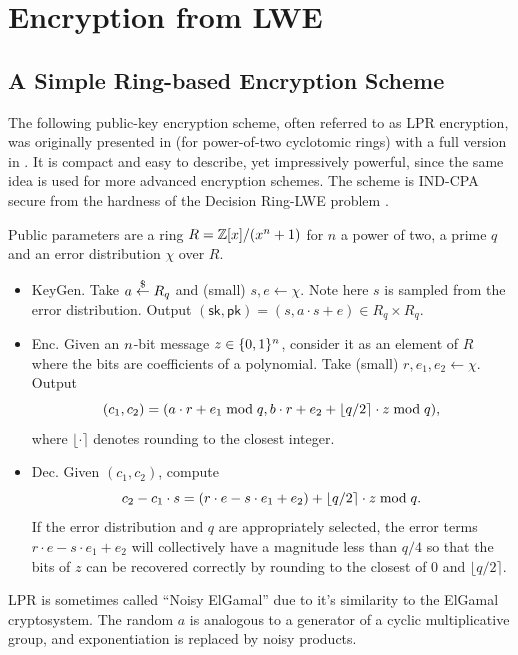 \section{Encryption from LWE}\label{sec:enc}

\subsection{A Simple Ring-based Encryption Scheme}
The following public-key encryption scheme, often referred to as LPR encryption, was originally presented in \cite{lpr10} (for power-of-two cyclotomic rings) with a full version in \cite{lpr13}. It is compact and easy to describe, yet impressively powerful, since the same idea is used for more advanced encryption schemes. The scheme is IND-CPA secure from the hardness of the Decision Ring-LWE problem \cite[Lemma 5.1]{lpr13}.

Public parameters are a ring $R = \mathbb{Z}[x]/(x^{n} + 1)$ for $n$ a power of two, a prime $q$ and an error distribution $\chi$ over $R$.

\begin{itemize}
    \item[-] \textsf{KeyGen.} Take $a \overset{\$}{\leftarrow} R_q$ and (small) $s,e \leftarrow \chi$. Note here $s$ is sampled from the error distribution. Output $(\mathsf{sk}, \mathsf{pk}) = (s, a \cdot s + e) \in R_q \times R_q$.
    \item[-] \textsf{Enc.} Given an $n$-bit message $z \in \{ 0,1 \}^{n}$, consider it as an element of $R$ where the bits are coefficients of a polynomial. Take (small) $r, e_1, e_2 \leftarrow \chi$. Output \[ (c_1, c_2) = (a \cdot r + e_1 \mathrm{\; mod \;} q, b \cdot r + e_2 + \lfloor q/2 \rceil \cdot z \mathrm{\; mod \;} q), \] where $\lfloor \cdot \rceil$ denotes rounding to the closest integer. 
    \item[-] \textsf{Dec.} Given $(c_1, c_2)$, compute \[ c_2 - c_1 \cdot s = (r \cdot e - s \cdot e_1 + e_2) + \lfloor q/2 \rceil \cdot z \mathrm{\; mod \;} q. \] If the error distribution and $q$ are appropriately selected, the error terms $r \cdot e - s \cdot e_1 + e_2$ will collectively have a magnitude less than $q/4$ so that the bits of $z$ can be recovered correctly by rounding to the closest of $0$ and $\lfloor q/2 \rceil$.
\end{itemize}
LPR is sometimes called ``Noisy ElGamal'' due to it's similarity to the ElGamal cryptosystem. The random $a$ is analogous to a generator of a cyclic multiplicative group, and exponentiation is replaced by noisy products. 

